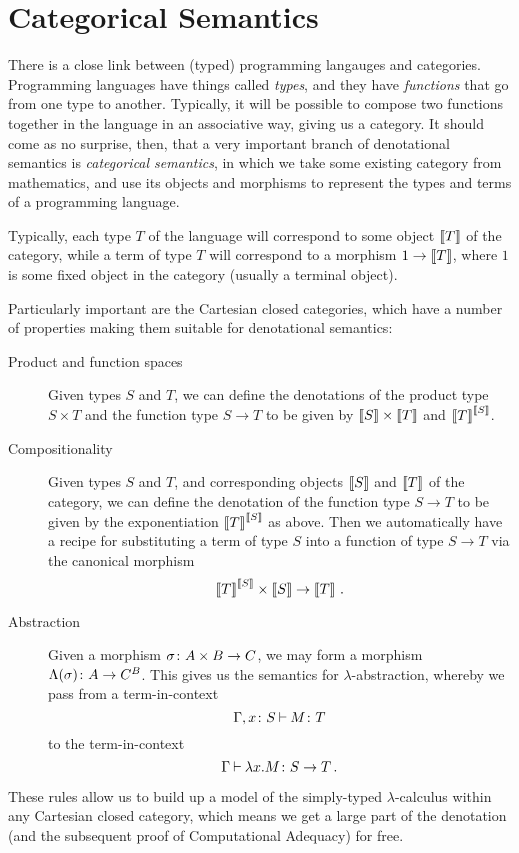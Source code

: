 \documentclass[11pt]{report}
\begin{document}
\section{Categorical Semantics}

There is a close link between (typed) programming langauges and categories.
Programming languages have things called \emph{types}, and they have \emph{functions} that go from one type to another. 
Typically, it will be possible to compose two functions together in the language in an associative way, giving us a category.
It should come as no surprise, then, that a very important branch of denotational semantics is \emph{categorical semantics}, in which we take some existing category from mathematics, and use its objects and morphisms to represent the types and terms of a programming language.

Typically, each type $T$ of the language will correspond to some object $\left\llbracket T\right\rrbracket$ of the category, while a term of type $T$ will correspond to a morphism $1 \to \left\llbracket T\right\rrbracket$, where $1$ is some fixed object in the category (usually a terminal object).

Particularly important \cite{Lambek} are the Cartesian closed categories, which have a number of properties making them suitable for denotational semantics:
\begin{description}
  \item[Product and function spaces] Given types $S$ and $T$, we can define the denotations of the product type $S \times T$ and the function type $S \to T$ to be given by $\left\llbracket S\right\rrbracket \times \left\llbracket T\right\rrbracket$ and ${\left\llbracket T\right\rrbracket}^{\left\llbracket S\right\rrbracket}$.
  \item[Compositionality] Given types $S$ and $T$, and corresponding objects $\left\llbracket S\right\rrbracket$ and $\left\llbracket T\right\rrbracket$ of the category, we can define the denotation of the function type $S \to T$ to be given by the exponentiation ${\left\llbracket T\right\rrbracket}^{\left\llbracket S\right\rrbracket}$ as above.
    Then we automatically have a recipe for substituting a term of type $S$ into a function of type $S\to T$ via the canonical morphism
    \[
      {\left\llbracket T\right\rrbracket}^{\left\llbracket S\right\rrbracket} \times \left\llbracket S\right\rrbracket \to \left\llbracket T\right\rrbracket\,.
      \]
  \item[Abstraction] Given a morphism $\sigma \colon A \times B \to C$, we may form a morphism $\Lambda(\sigma) \colon A \to C^B$.
    This gives us the semantics for $\lambda$-abstraction, whereby we pass from a term-in-context
    \[
      \Gamma,x\colon S \mathbin{\vdash} M \colon T
      \]
    to the term-in-context
    \[
      \Gamma \mathbin{\vdash} \lambda x.M\colon S \to T\,.
      \]
\end{description}
These rules allow us to build up a model of the simply-typed $\lambda$-calculus within any Cartesian closed category, which means we get a large part of the denotation (and the subsequent proof of Computational Adequacy) for free.  
\end{document}

